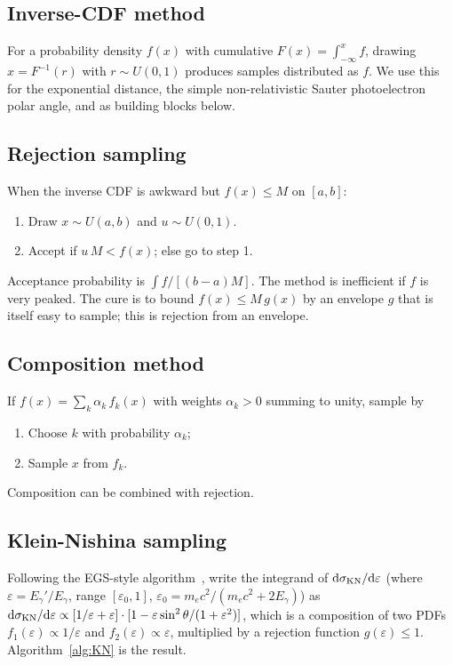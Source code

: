 \documentclass[11pt,a4paper]{article}
\newcommand{\Eg}{E_\gamma}
\newcommand{\Egp}{E_\gamma'}
\newcommand{\me}{m_e c^2}
\newcommand{\eps}{\varepsilon}
\newcommand{\sigKN}{\sigma_{\rm KN}}
\begin{document}
\subsection{Inverse-CDF method}

For a probability density $f(x)$ with cumulative
$F(x)=\int_{-\infty}^x f$, drawing $x = F^{-1}(r)$ with $r\sim
U(0,1)$ produces samples distributed as $f$. We use this for the
exponential distance, the simple non-relativistic Sauter
photoelectron polar angle, and as building blocks below.

\subsection{Rejection sampling}

When the inverse CDF is awkward but $f(x) \le M$ on $[a,b]$:
\begin{enumerate}\itemsep=0pt
  \item Draw $x \sim U(a,b)$ and $u \sim U(0,1)$.
  \item Accept if $u\,M < f(x)$; else go to step 1.
\end{enumerate}
Acceptance probability is $\int f / [(b-a)M]$. The method is
inefficient if $f$ is very peaked. The cure is to bound
$f(x) \le M\,g(x)$ by an envelope $g$ that is itself easy to
sample; this is rejection from an envelope.

\subsection{Composition method}\label{sec:composition}

If $f(x)=\sum_k\alpha_k\,f_k(x)$ with weights $\alpha_k>0$
summing to unity, sample by
\begin{enumerate}\itemsep=0pt
  \item Choose $k$ with probability $\alpha_k$;
  \item Sample $x$ from $f_k$.
\end{enumerate}
Composition can be combined with rejection.

\subsection{Klein-Nishina sampling}

Following the EGS-style algorithm~\cite{ButcherMessel,EGS4,G4-PRM},
write the integrand of $\dd\sigKN/\dd\eps$ (where $\eps=\Egp/\Eg$,
range $[\eps_0,1]$, $\eps_0=\me/(\me+2\Eg)$) as
\(\dd\sigKN/\dd\eps \propto [1/\eps + \eps] \cdot
[1 - \eps\sin^2\theta/(1+\eps^2)]\),
which is a composition of two PDFs $f_1(\eps)\propto 1/\eps$ and
$f_2(\eps)\propto \eps$, multiplied by a rejection function
$g(\eps)\le 1$. Algorithm~\ref{alg:KN} is the result.
\end{document}
